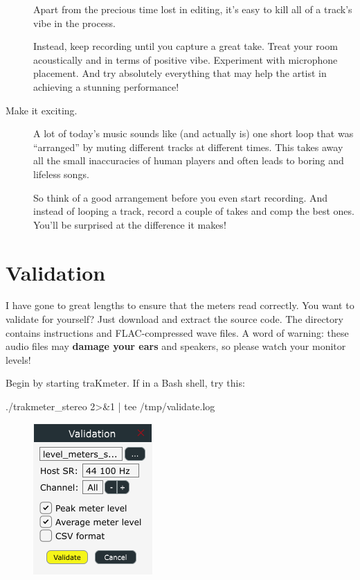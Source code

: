 \begin{description}
  Apart from the precious time lost in editing, it's easy to kill all
  of a track's vibe in the process.

  Instead, keep recording until you capture a great take.  Treat your
  room acoustically and in terms of positive vibe.  Experiment with
  microphone placement.  And try absolutely everything that may help
  the artist in achieving a stunning performance!

\item[Make it exciting.]  A lot of today's music sounds like (and
  actually is) one short loop that was ``arranged'' by muting
  different tracks at different times.  This takes away all the small
  inaccuracies of human players and often leads to boring and lifeless
  songs.

  So think of a good arrangement before you even start recording.  And
  instead of looping a track, record a couple of takes and comp the
  best ones.  You'll be surprised at the difference it makes!

\end{description}

\chapter{Validation}
\label{chap:validation}

I have gone to great lengths to ensure that the meters read correctly.
You want to validate for yourself?  Just download and extract the
source code.  The directory  contains instructions
and FLAC-compressed wave files.  A word of warning: these audio files
may \textbf{damage your ears} and speakers, so please watch your
monitor levels!

Begin by starting traKmeter.  If in a Bash shell, try this:

\begin{VerbatimBoth}
  ./trakmeter_stereo 2>&1 | tee /tmp/validate.log
\end{VerbatimBoth}

\begin{figure}
  \includegraphics[scale=0.60,clip]{include/images/dialog_validation.png}
\end{figure}

